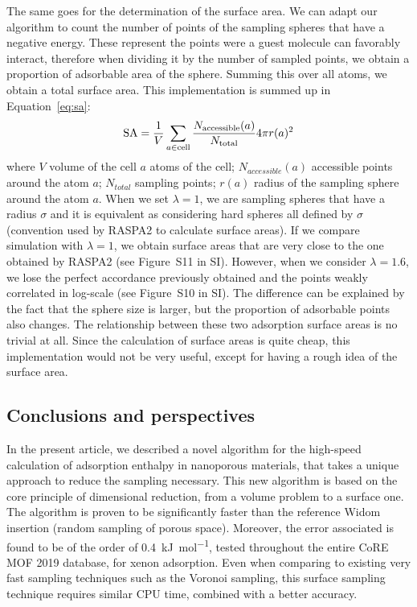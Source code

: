 \documentclass[main]{subfiles}
\begin{document}
The same goes for the determination of the surface area. We can adapt our algorithm to count the number of points of the sampling spheres that have a negative energy. These represent the points were a guest molecule can favorably interact, therefore when dividing it by the number of sampled points, we obtain a proportion of adsorbable area of the sphere. Summing this over all atoms, we obtain a total surface area. This implementation is summed up in Equation~\ref{eq:sa}:
\begin{equation}
\label{eq:sa}
    \textrm{SA} = \dfrac{1}{V}\sum_{a\in \textrm{cell}} \dfrac{N_{\text{accessible}}(a)}{N_{\text{total}}}4\pi r(a)^2
\end{equation}
where $V$ volume of the cell $a$ atoms of the cell; $N_{accessible}(a)$ accessible points around the atom $a$; $N_{total}$ sampling points; $r(a)$ radius of the sampling sphere around the atom $a$.
When we set $\lambda=1$, we are sampling spheres that have a radius $\sigma$ and it is equivalent as considering hard spheres all defined by $\sigma$ (convention used by RASPA2 to calculate surface areas). If we compare simulation with $\lambda=1$, we obtain surface areas that are very close to the one obtained by RASPA2 (see Figure~S11 in SI). However, when we consider $\lambda=1.6$, we lose the perfect accordance previously obtained and the points weakly correlated in log-scale (see Figure~S10 in SI). The difference can be explained by the fact that the sphere size is larger, but the proportion of adsorbable points also changes. The relationship between these two adsorption surface areas is no trivial at all. Since the calculation of surface areas is quite cheap, this implementation would not be very useful, except for having a rough idea of the surface area.


\subsection{Conclusions and perspectives}

In the present article, we described a novel algorithm for the high-speed calculation of adsorption enthalpy in nanoporous materials, that takes a unique approach to reduce the sampling necessary. This new algorithm is based on the core principle of dimensional reduction, from a volume problem to a surface one. The algorithm is proven to be significantly faster than the reference Widom insertion (random sampling of porous space). Moreover, the error associated is found to be of the order of \SI{0.4}{\kilo\joule\per\mole}, tested throughout the entire CoRE MOF 2019 database, for xenon adsorption. Even when comparing to existing very fast sampling techniques such as the Voronoi sampling, this surface sampling technique requires similar CPU time, combined with a better accuracy. 
\end{document}

